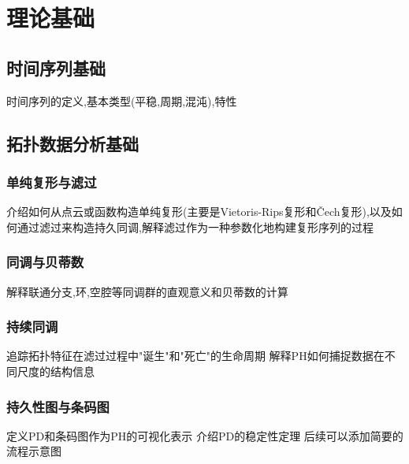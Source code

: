 \section{理论基础}
\subsection{时间序列基础}
时间序列的定义,基本类型(平稳,周期,混沌),特性
\subsection{拓扑数据分析基础}
\subsubsection{单纯复形与滤过}
介绍如何从点云或函数构造单纯复形(主要是Vietoris-Rips复形和Čech复形),以及如何通过滤过来构造持久同调,解释滤过作为一种参数化地构建复形序列的过程
\subsubsection{同调与贝蒂数}
解释联通分支,环,空腔等同调群的直观意义和贝蒂数的计算
\subsubsection{持续同调}
追踪拓扑特征在滤过过程中"诞生"和"死亡"的生命周期
解释PH如何捕捉数据在不同尺度的结构信息
\subsubsection{持久性图与条码图}
定义PD和条码图作为PH的可视化表示
介绍PD的稳定性定理
后续可以添加简要的流程示意图
